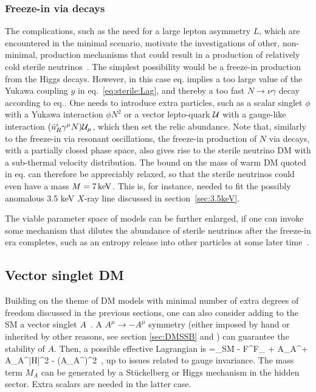 \subsubsection{Freeze-in via decays}
The complications, such as the need for a large lepton asymmetry $L$, which are encountered in the minimal scenario, 
motivate the  investigations of other, non-minimal, production mechanisms that could result in a production of
relatively cold sterile neutrinos~\cite{SterileNu}.
The simplest possibility would be a freeze-in production from the Higgs decays. 
However, in this case eq. implies a too large value of the Yukawa coupling $y$ in eq.~\eqref{eq:sterile:Lag},
and thereby a too fast $N\to\nu\gamma$ decay according to eq..
One needs to introduce extra particles, such as a
scalar singlet $\phi$ with a Yukawa interaction $\phi N^2$ 
or a vector lepto-quark ${\cal U}$ with a gauge-like interaction 
$( \bar u_R^i \gamma^\mu N) {\cal U}_\mu$, which then set the relic abundance.
Note that, similarly to the freeze-in via resonant oscillations, the freeze-in production of $N$ via decays, with a partially closed phase space, also
gives rise to the sterile neutrino DM with a sub-thermal velocity distribution. The bound on the mass of warm DM
quoted in eq. can therefore be appreciably relaxed, so that the sterile neutrinos could even have a mass $M = 7\,{\rm keV}$. This is, for instance,
needed to fit the possibly anomalous 3.5 keV $X$-ray line discussed in section~\ref{sec:3.5keV}.


The viable parameter space of models can be further enlarged, if one can invoke some mechanism that dilutes the abundance of sterile neutrinos after the freeze-in era completes, such as an entropy release into other particles at some later time~\cite{SterileNu,DM:entropy:injection}.


\subsection{Vector singlet DM}\label{VectorSinglet}
Building on the theme of DM models with minimal number of extra degrees of freedom discussed
in the previous sections, one can also consider adding to the SM a vector singlet $A$~\cite{VectorSinglet}. 
A $A^\mu \to -A^\mu$ symmetry (either imposed by hand or inherited by other reasons, see section \ref{sec:DMSSB} and \cite{VectorSinglet}) can guarantee the stability of $A$.
Then, a possible effective Lagrangian is  
\beq 
\Lag =\Lag_{\rm SM } - F^{\mu\nu}F_{\mu\nu} +  A_\mu A^\mu + A_\mu A^\mu |H|^2 -  (A_\mu A^\mu)^2\ , 
\label{eq:LVectorSinglet}
\eeq
up to issues related to gauge invariance.
The mass term $M_A$ can be generated by a St\"uckelberg or Higgs mechanism in the hidden sector.
Extra scalars are needed in the latter case.


